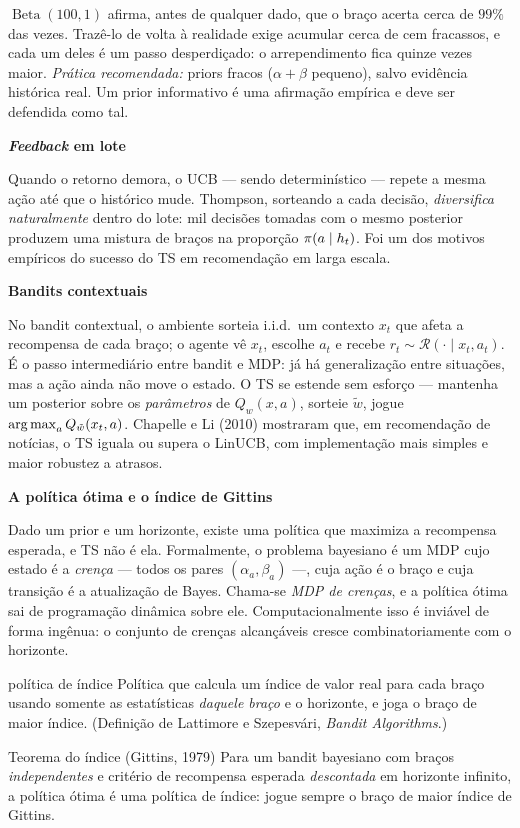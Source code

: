 \documentclass[11pt, a4paper]{article}
\newcommand{\Bdist}{\operatorname{Beta}}
\newcommand{\hist}{h_t}
\newcommand{\subt}[1]{\medskip\noindent\textbf{\color{rlAzulClaro}#1}\par\nobreak\smallskip}
\begin{document}
\noindent
$\Bdist(100,1)$ afirma, antes de qualquer dado, que o braço acerta cerca de
$99\%$ das vezes. Trazê-lo de volta à realidade exige acumular cerca de cem
fracassos, e cada um deles é um passo desperdiçado: o arrependimento fica quinze
vezes maior. \emph{Prática recomendada:} priors fracos ($\alpha+\beta$ pequeno),
salvo evidência histórica real. Um prior informativo é uma afirmação empírica e
deve ser defendida como tal.

\subt{\emph{Feedback} em lote}
Quando o retorno demora, o UCB — sendo determinístico — repete a mesma ação até
que o histórico mude. Thompson, sorteando a cada decisão, \emph{diversifica
naturalmente} dentro do lote: mil decisões tomadas com o mesmo posterior
produzem uma mistura de braços na proporção $\pol(a\mid \hist)$. Foi um dos
motivos empíricos do sucesso do TS em recomendação em larga escala.

\subt{Bandits contextuais}
No bandit contextual, o ambiente sorteia i.i.d.\ um contexto $x_t$ que afeta a
recompensa de cada braço; o agente vê $x_t$, escolhe $a_t$ e recebe
$r_t \sim \mathcal{R}(\cdot \mid x_t, a_t)$. É o passo intermediário entre
bandit e MDP: já há generalização entre situações, mas a ação ainda não move o
estado. O TS se estende sem esforço — mantenha um posterior sobre os
\emph{parâmetros} de $Q_w(x,a)$, sorteie $\tilde w$, jogue
$\operatorname*{arg\,max}_a Q_{\tilde w}(x_t,a)$. Chapelle e Li (2010) mostraram que, em
recomendação de notícias, o TS iguala ou supera o LinUCB, com implementação mais
simples e maior robustez a atrasos.

\subt{A política ótima e o índice de Gittins}
Dado um prior e um horizonte, existe uma política que maximiza a recompensa
esperada, e TS não é ela. Formalmente, o problema bayesiano é um MDP cujo estado
é a \emph{crença} — todos os pares $(\alpha_a,\beta_a)$ —, cuja ação é o braço e
cuja transição é a atualização de Bayes. Chama-se \emph{MDP de crenças}, e a
política ótima sai de programação dinâmica sobre ele. Computacionalmente isso é
inviável de forma ingênua: o conjunto de crenças alcançáveis cresce
combinatoriamente com o horizonte.

\begin{defbox}{política de índice}
Política que calcula um índice de valor real para cada braço usando somente as
estatísticas \emph{daquele braço} e o horizonte, e joga o braço de maior índice.
(Definição de Lattimore e Szepesvári, \emph{Bandit Algorithms}.)
\end{defbox}

\begin{teobox}{Teorema do índice (Gittins, 1979)}
Para um bandit bayesiano com braços \emph{independentes} e critério de recompensa
esperada \emph{descontada} em horizonte infinito, a política ótima é uma
política de índice: jogue sempre o braço de maior índice de Gittins.
\end{teobox}
\end{document}
